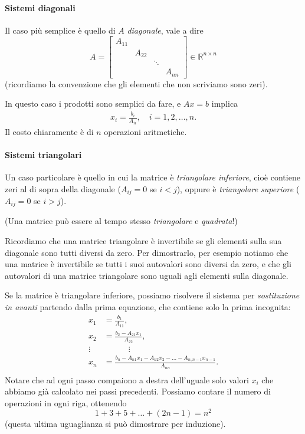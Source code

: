 \documentclass[a4paper]{report}
\theoremstyle{definition}
\theoremstyle{remark}
\begin{document}
\paragraph{Sistemi diagonali}

Il caso più semplice è quello di $A$ \emph{diagonale}, vale a dire
\[  
A = \begin{bmatrix}
    A_{11} \\
    & A_{22}\\
    && \ddots\\
    &&& A_{nn}
\end{bmatrix} \in \mathbb{R}^{n \times n}
\]
(ricordiamo la convenzione che gli elementi che non scriviamo sono zeri).

In questo caso i prodotti sono semplici da fare, e $Ax=b$ implica
\begin{align*}
x_i = \frac{b_i}{A_{ii}}, \quad i=1,2,\dots,n.
\end{align*}
Il costo chiaramente è di $n$ operazioni aritmetiche.

\paragraph{Sistemi triangolari}

Un caso particolare  è quello in cui la matrice è \emph{triangolare inferiore}, cioè contiene zeri al di sopra della diagonale ($A_{ij} =0$ se $i<j$), oppure è \emph{triangolare superiore} ($A_{ij}=0$ se $i>j$).

(Una matrice può essere al tempo stesso \emph{triangolare} e \emph{quadrata}!)

Ricordiamo che una matrice triangolare è invertibile se gli elementi sulla sua diagonale sono tutti diversi da zero. Per dimostrarlo, per esempio notiamo che una matrice è invertibile se tutti i suoi autovalori sono diversi da zero, e che gli autovalori di una matrice triangolare sono uguali agli elementi sulla diagonale.

Se la matrice è triangolare inferiore, possiamo risolvere il sistema per \emph{sostituzione in avanti} partendo dalla prima equazione, che contiene solo la prima incognita:
\begin{align*}
 x_1 &= \frac{b_1}{A_{11}},\\
 x_2 &= \frac{b_2 - A_{21}x_1}{A_{22}},\\
 \vdots & \quad \quad \quad \vdots\\
 x_n &= \frac{b_n - A_{n1}x_1 - A_{n2}x_2 - \dots -A_{n,n-1}x_{n-1}}{A_{nn}}.\\
 \end{align*}
Notare che ad ogni passo compaiono a destra dell'uguale solo valori $x_i$ che abbiamo già calcolato nei passi precedenti.
Possiamo contare il numero di operazioni in ogni riga, ottenendo
\[
1 + 3 + 5 + \dots + (2n-1) = n^2
\]
(questa ultima uguaglianza si può dimostrare per induzione).
\end{document}
